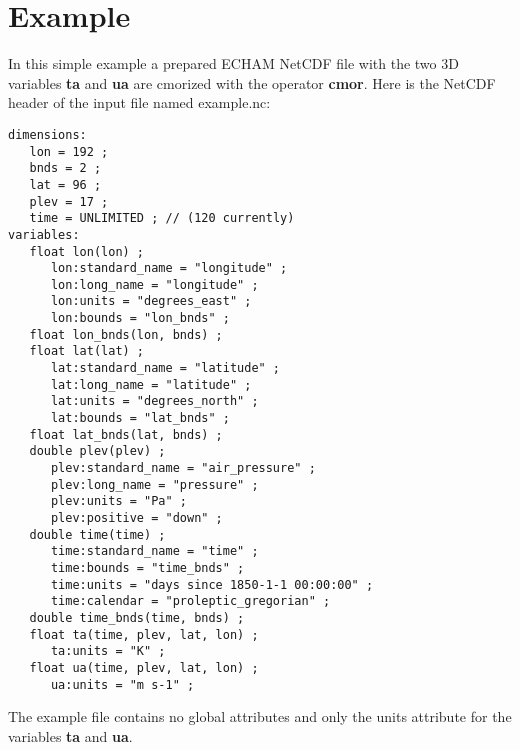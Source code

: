 \appendix

\chapter{Example}

In this simple example a prepared ECHAM NetCDF file with the two 3D
variables \textbf{ta} and \textbf{ua} are cmorized with the {\CDO} operator \textbf{cmor}. 
Here is the NetCDF header of the input file named example.nc:
\begin{lstlisting}[frame=single, backgroundcolor=\color{pcolor1}, basicstyle=\footnotesize]
dimensions:
   lon = 192 ;
   bnds = 2 ;
   lat = 96 ;
   plev = 17 ;
   time = UNLIMITED ; // (120 currently)
variables:
   float lon(lon) ;
      lon:standard_name = "longitude" ;
      lon:long_name = "longitude" ;
      lon:units = "degrees_east" ;
      lon:bounds = "lon_bnds" ;
   float lon_bnds(lon, bnds) ;
   float lat(lat) ;
      lat:standard_name = "latitude" ;
      lat:long_name = "latitude" ;
      lat:units = "degrees_north" ;
      lat:bounds = "lat_bnds" ;
   float lat_bnds(lat, bnds) ;
   double plev(plev) ;
      plev:standard_name = "air_pressure" ;
      plev:long_name = "pressure" ;
      plev:units = "Pa" ;
      plev:positive = "down" ;
   double time(time) ;
      time:standard_name = "time" ;
      time:bounds = "time_bnds" ;
      time:units = "days since 1850-1-1 00:00:00" ;
      time:calendar = "proleptic_gregorian" ;
   double time_bnds(time, bnds) ;
   float ta(time, plev, lat, lon) ;
      ta:units = "K" ;
   float ua(time, plev, lat, lon) ;
      ua:units = "m s-1" ;
\end{lstlisting}
The example file contains no global attributes and only the units
attribute for the variables \textbf{ta} and \textbf{ua}.

